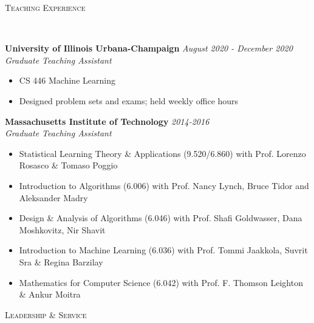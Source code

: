 \documentclass{article}
\newenvironment{changemargin}[2]{%
  \begin{list}{}{%
    \setlength{\topsep}{0pt}%
    \setlength{\leftmargin}{#1}%
    \setlength{\rightmargin}{#2}%
    \setlength{\listparindent}{\parindent}%
    \setlength{\itemindent}{\parindent}%
    \setlength{\parsep}{\parskip}%
  }%
  \item[]}{\end{list}
}
\newcommand{\lineover}{
	\begin{changemargin}{-0.05in}{-0.05in}
		\vspace*{-8pt}
		\hrulefill \\
		\vspace*{-2pt}
	\end{changemargin}
}
\newcommand{\header}[1]{
	\begin{changemargin}{-0.5in}{-0.5in}
		\scshape{#1}\\
  	\lineover
	\end{changemargin}
}
\newenvironment{body} {
	\vspace*{-16pt}
	\begin{changemargin}{-0.25in}{-0.5in}
  }	
	{\end{changemargin}
}
\begin{document}
\header{Teaching Experience}
\begin{body}
	\vspace{16pt}
	
    \textbf{University of Illinois Urbana-Champaign} \hfill \emph{August 2020 - December 2020}\\
	\emph{Graduate Teaching Assistant}\\
	\vspace*{-3pt}
	\begin{itemize} \itemsep -2pt
		\item CS 446 Machine Learning
		\item Designed problem sets and exams; held weekly office hours
	\end{itemize}
    
    \textbf{Massachusetts Institute of Technology} \hfill \emph{2014-2016}\\
	\emph{Graduate Teaching Assistant}\\
	\vspace*{-3pt}
	\begin{itemize} \itemsep -2pt
	\item Statistical Learning Theory \& Applications (9.520/6.860) with Prof. Lorenzo Rosasco \& Tomaso Poggio
        \item Introduction to Algorithms (6.006) with Prof. Nancy Lynch, Bruce Tidor and Aleksander Madry
        \item Design \& Analysis of Algorithms (6.046) with Prof. Shafi Goldwasser, Dana Moshkovitz, Nir Shavit
        \item Introduction to Machine Learning (6.036) with Prof. Tommi Jaakkola, Suvrit Sra \& Regina Barzilay
        \item Mathematics for Computer Science (6.042) with Prof. F. Thomson Leighton \& Ankur Moitra
	\end{itemize}
\end{body}

\header{Leadership \& Service}
\end{document}
